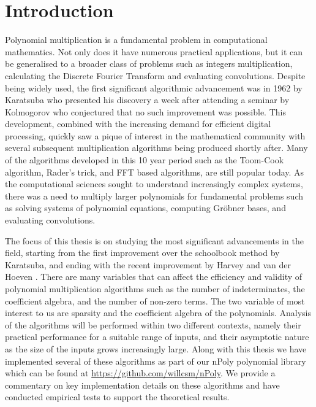 \chapter{Introduction}\label{introduction}


Polynomial multiplication is a fundamental problem in computational mathematics. Not only does it have numerous practical applications, but it can be generalised to a broader class of problems such as integers multiplication, calculating the Discrete Fourier Transform and evaluating convolutions. Despite being widely used, the first significant algorithmic advancement was in 1962 by Karatsuba \cite{karatsuba} who presented his discovery a week after attending a seminar by Kolmogorov who conjectured that no such improvement was possible. This development, combined with the increasing demand for efficient digital processing, quickly saw a pique of interest in the mathematical community with several subsequent multiplication algorithms being produced shortly after. Many of the algorithms developed in this 10 year period such as the Toom-Cook algorithm, Rader's trick, and FFT based algorithms, are still popular today. As the computational sciences sought to understand increasingly complex systems, there was a need to multiply larger polynomials for fundamental problems such as solving systems of polynomial equations, computing Gr\"{o}bner bases, and evaluating convolutions.

\medskip

The focus of this thesis is on studying the most significant advancements in the field, starting from the first improvement over the schoolbook method by Karatsuba, and ending with the recent improvement by Harvey and van der Hoeven \cite{nlogn}. There are many variables that can affect the efficiency and validity of polynomial multiplication algorithms such as the number of indeterminates, the coefficient algebra, and the number of non-zero terms. The two variable of most interest to us are sparsity and the coefficient algebra of the polynomials. Analysis of the algorithms will be performed within two different contexts, namely their practical performance for a suitable range of inputs, and their asymptotic nature as the size of the inputs grows increasingly large. Along with this thesis we have implemented several of these algorithms as part of our nPoly polynomial library which can be found at \url{https://github.com/willcsm/nPoly}. We provide a commentary on key implementation details on these algorithms and have conducted empirical tests to support the theoretical results.

